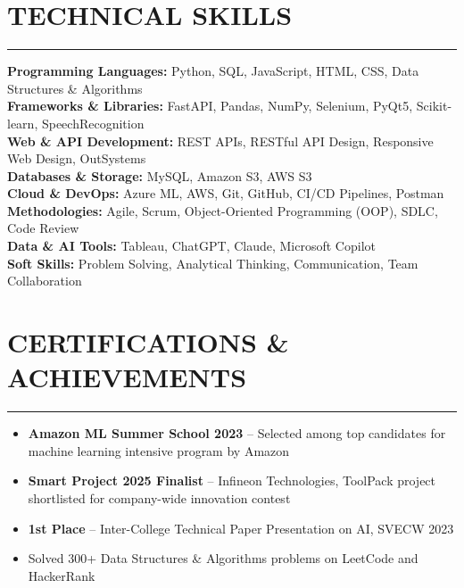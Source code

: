 \documentclass[10pt,a4paper]{article}
\newcommand{\sectionline}{
\vspace{-2pt}
\hrule
\vspace{4pt}
}
\begin{document}
\section*{TECHNICAL SKILLS}
\sectionline
\textbf{Programming Languages:} Python, SQL, JavaScript, HTML, CSS, Data Structures \& Algorithms\\
\textbf{Frameworks \& Libraries:} FastAPI, Pandas, NumPy, Selenium, PyQt5, Scikit-learn, SpeechRecognition\\
\textbf{Web \& API Development:} REST APIs, RESTful API Design, Responsive Web Design, OutSystems\\
\textbf{Databases \& Storage:} MySQL, Amazon S3, AWS S3\\
\textbf{Cloud \& DevOps:} Azure ML, AWS, Git, GitHub, CI/CD Pipelines, Postman\\
\textbf{Methodologies:} Agile, Scrum, Object-Oriented Programming (OOP), SDLC, Code Review\\
\textbf{Data \& AI Tools:} Tableau, ChatGPT, Claude, Microsoft Copilot\\
\textbf{Soft Skills:} Problem Solving, Analytical Thinking, Communication, Team Collaboration

\section*{CERTIFICATIONS \& ACHIEVEMENTS}
\sectionline
\begin{itemize}
\item \textbf{Amazon ML Summer School 2023} -- Selected among top candidates for machine learning intensive program by Amazon
\item \textbf{Smart Project 2025 Finalist} -- Infineon Technologies, ToolPack project shortlisted for company-wide innovation contest
\item \textbf{1st Place} -- Inter-College Technical Paper Presentation on AI, SVECW 2023
\item Solved 300+ Data Structures \& Algorithms problems on LeetCode and HackerRank
\end{itemize}
\end{document}
